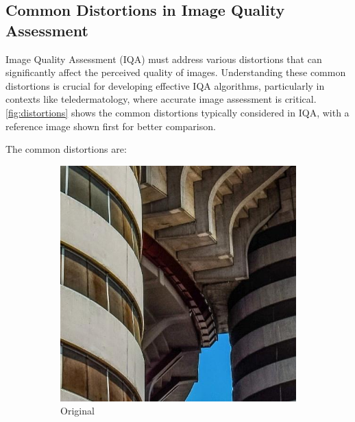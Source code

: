 \subsection{Common Distortions in Image Quality Assessment}
\label{sub:CommonDistortionsIQA}
Image Quality Assessment (IQA) must address various distortions that can significantly affect the perceived quality of images. Understanding these common distortions is crucial for developing effective IQA algorithms, particularly in contexts like teledermatology, where accurate image assessment is critical. \autoref{fig:distortions} shows the common distortions typically considered in IQA, with a reference image shown first for better comparison. \par
\vspace{\baselineskip}
\noindent
The common distortions are:
\begin{figure}[ht]
    \centering
    \begin{subfigure}[b]{0.24\textwidth}
        \includegraphics[width=\textwidth]{img/Original.jpg}
        \caption{Original}
    \end{subfigure}
    \hfill
    \begin{subfigure}[b]{0.24\textwidth}

\end{subfigure}
\end{figure}
